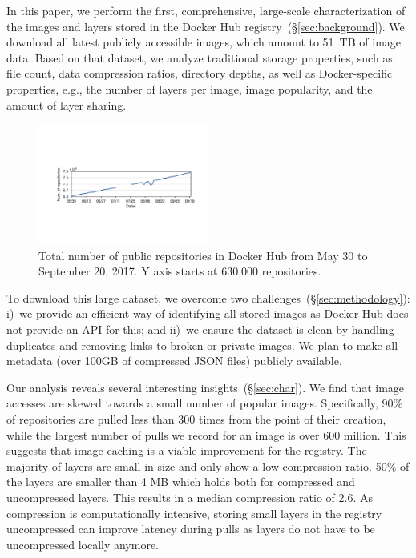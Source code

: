 In this paper, we perform the first, comprehensive, large-scale characterization
of the images and layers stored in the Docker Hub
registry~(\S\ref{sec:background}).
%
We download all latest publicly accessible images, which amount to 51~TB of
image data. Based on that dataset, we analyze traditional storage properties, such
as file count, data compression ratios, directory depths, as well as
Docker-specific properties, e.g., the number of layers per image, image popularity,
and the amount of layer sharing.


\begin{figure}
	\centering
	\includegraphics[width=0.5\textwidth]{graphs/image_growth.pdf}
	\caption{Total number of public repositories in Docker Hub
		from May 30 to September 20, 2017. Y axis starts
		at 630,000 repositories.
	}
	\label{fig_image_growth}
\end{figure}

To download this large dataset, we overcome two
challenges~(\S\ref{sec:methodology}): i)~we provide an efficient way of identifying
all stored images as Docker Hub does not provide an API for this;
and ii)~we ensure the dataset is clean by handling
duplicates and removing links to broken or private images.
We plan to make all metadata (over 100GB of compressed
JSON files) publicly available.

Our analysis reveals several interesting insights~(\S\ref{sec:char}). 
We find that image
accesses are skewed towards a small number of popular images. Specifically,
90\% of repositories are pulled less than 300 times from the point of their
creation, while the largest number of pulls we record for an image is
over 600 million. This suggests that image caching is a viable improvement
for the registry.
%
The majority of layers are small in size and only show a low compression ratio.
50\% of the layers are smaller than 4 MB which holds both for compressed and 
uncompressed layers. This results in a median compression ratio of 2.6.
As compression is computationally intensive, storing small layers in the
registry uncompressed can improve latency during pulls as layers do not
have to be uncompressed locally anymore.

